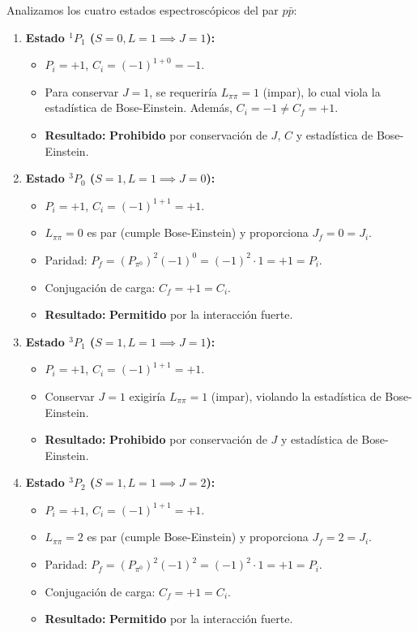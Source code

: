 \begin{problema}
Analizamos los cuatro estados espectroscópicos del par $p\bar{p}$:

\begin{enumerate}[label=\arabic*.]
    \item \textbf{Estado $^1P_1$ ($S=0, L=1 \implies J=1$):}
    \begin{itemize}
        \item $P_i = +1$, $C_i = (-1)^{1+0} = -1$.
        \item Para conservar $J=1$, se requeriría $L_{\pi\pi} = 1$ (impar), lo cual viola la estadística de Bose-Einstein. Además, $C_i = -1 \neq C_f = +1$.
        \item \textbf{Resultado:} \textbf{Prohibido} por conservación de $J$, $C$ y estadística de Bose-Einstein.
    \end{itemize}

    \item \textbf{Estado $^3P_0$ ($S=1, L=1 \implies J=0$):}
    \begin{itemize}
        \item $P_i = +1$, $C_i = (-1)^{1+1} = +1$.
        \item $L_{\pi\pi} = 0$ es par (cumple Bose-Einstein) y proporciona $J_f = 0 = J_i$.
        \item Paridad: $P_f = (P_{\pi^0})^2 (-1)^0 = (-1)^2 \cdot 1 = +1 = P_i$.
        \item Conjugación de carga: $C_f = +1 = C_i$.
        \item \textbf{Resultado:} \textbf{Permitido} por la interacción fuerte.
    \end{itemize}

    \item \textbf{Estado $^3P_1$ ($S=1, L=1 \implies J=1$):}
    \begin{itemize}
        \item $P_i = +1$, $C_i = (-1)^{1+1} = +1$.
        \item Conservar $J=1$ exigiría $L_{\pi\pi}=1$ (impar), violando la estadística de Bose-Einstein.
        \item \textbf{Resultado:} \textbf{Prohibido} por conservación de $J$ y estadística de Bose-Einstein.
    \end{itemize}

    \item \textbf{Estado $^3P_2$ ($S=1, L=1 \implies J=2$):}
    \begin{itemize}
        \item $P_i = +1$, $C_i = (-1)^{1+1} = +1$.
        \item $L_{\pi\pi} = 2$ es par (cumple Bose-Einstein) y proporciona $J_f = 2 = J_i$.
        \item Paridad: $P_f = (P_{\pi^0})^2 (-1)^2 = (-1)^2 \cdot 1 = +1 = P_i$.
        \item Conjugación de carga: $C_f = +1 = C_i$.
        \item \textbf{Resultado:} \textbf{Permitido} por la interacción fuerte.
    \end{itemize}
\end{enumerate}


\end{problema}
